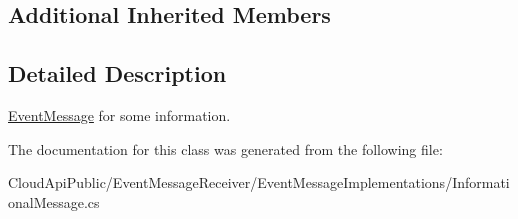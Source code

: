 \subsection*{Additional Inherited Members}


\subsection{Detailed Description}
\hyperlink{class_cloud_api_public_1_1_event_message_receiver_1_1_event_message}{Event\-Message} for some information. 



The documentation for this class was generated from the following file\-:\begin{DoxyCompactItemize}
\item 
Cloud\-Api\-Public/\-Event\-Message\-Receiver/\-Event\-Message\-Implementations/Informational\-Message.\-cs\end{DoxyCompactItemize}
